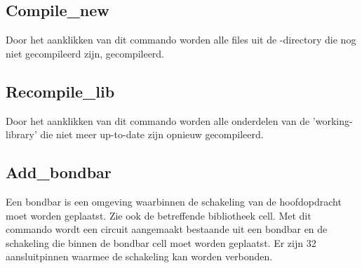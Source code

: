 \subsection{Compile\_new}
Door het aanklikken van dit commando worden alle files uit de -directory
die nog niet gecompileerd zijn, gecompileerd.

\subsection{Recompile\_lib}
Door het aanklikken van dit commando worden alle onderdelen van de
'working-library' die niet meer up-to-date zijn opnieuw gecompileerd.

\subsection{Add\_bondbar}
Een bondbar is een omgeving waarbinnen de schakeling van de hoofdopdracht
moet worden geplaatst. Zie ook de betreffende bibliotheek cell.
Met dit commando wordt een circuit aangemaakt bestaande uit een bondbar
en de schakeling die binnen de bondbar cell moet worden geplaatst.
Er zijn 32 aansluitpinnen waarmee de schakeling kan worden verbonden.

